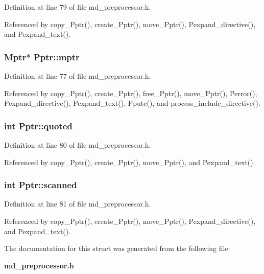 Definition at line 79 of file md\_\-preprocessor.h.

Referenced by copy\_\-Pptr(), create\_\-Pptr(), move\_\-Pptr(), Pexpand\_\-directive(), and Pexpand\_\-text().
\subsubsection{\setlength{\rightskip}{0pt plus 5cm}\bf{Mptr}$\ast$ \bf{Pptr::mptr}}\label{structPptr_908df598f1fde8927c143cc25a42c8b7}




Definition at line 77 of file md\_\-preprocessor.h.

Referenced by copy\_\-Pptr(), create\_\-Pptr(), free\_\-Pptr(), move\_\-Pptr(), Perror(), Pexpand\_\-directive(), Pexpand\_\-text(), Pputc(), and process\_\-include\_\-directive().
\subsubsection{\setlength{\rightskip}{0pt plus 5cm}int \bf{Pptr::quoted}}\label{structPptr_61a35abe3929d4bc1c5b8bc63c9c80bc}




Definition at line 80 of file md\_\-preprocessor.h.

Referenced by copy\_\-Pptr(), create\_\-Pptr(), move\_\-Pptr(), and Pexpand\_\-text().
\subsubsection{\setlength{\rightskip}{0pt plus 5cm}int \bf{Pptr::scanned}}\label{structPptr_1fb5d4feba9b800f7ff6d2a4acf22f8c}




Definition at line 81 of file md\_\-preprocessor.h.

Referenced by copy\_\-Pptr(), create\_\-Pptr(), move\_\-Pptr(), Pexpand\_\-directive(), and Pexpand\_\-text().

The documentation for this struct was generated from the following file:\begin{CompactItemize}
\item 
\bf{md\_\-preprocessor.h}\end{CompactItemize}
